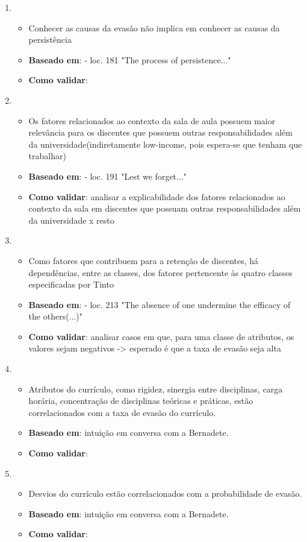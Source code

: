 \documentclass{article}
\begin{document}
\begin{enumerate}
\item 
	\begin{itemize}
	\item Conhecer as causas da evasão não implica em conhecer as causas da persistência
	\item \textbf{Baseado em}: \cite{tinto_completing} - loc. 181 "The process of persistence..."
	\item \textbf{Como validar}: 
	\end{itemize}
	
\item 
	\begin{itemize}
	\item Os fatores relacionados ao contexto da sala de aula possuem maior relevância para os discentes que possuem outras responsabilidades além da universidade(indiretamente low-income, pois espera-se que tenham que trabalhar)
	\item \textbf{Baseado em}: \cite{tinto_completing} - loc. 191 "Lest we forget..."
	\item \textbf{Como validar}: analisar a explicabilidade dos fatores relacionados ao contexto da sala em discentes que possuam outras responsabilidades além da universidade x resto
	\end{itemize}
	
\item 
	\begin{itemize}
	\item Como fatores que contribuem para a retenção de discentes, há dependências, entre as classes, dos fatores pertencente às quatro classes especificadas por Tinto
	\item \textbf{Baseado em}: \cite{tinto_completing} - loc. 213 "The absence of one undermine the efficacy of the others(...)"
	\item \textbf{Como validar}: analisar casos em que, para uma classe de atributos, os valores sejam negativos -> esperado é que a taxa de evasão seja alta
	\end{itemize}
	
\item 
	\begin{itemize}
	\item Atributos do currículo, como rigidez, sinergia entre disciplinas, carga horária, concentração de disciplinas teóricas e práticas, estão correlacionados com a taxa de evasão do currículo.
	\item \textbf{Baseado em}: intuição em conversa com a Bernadete.
	\item \textbf{Como validar}: 
	\end{itemize}	

\item 
	\begin{itemize}
	\item Desvios do currículo estão correlacionados com a probabilidade de evasão.
	\item \textbf{Baseado em}: intuição em conversa com a Bernadete.
	\item \textbf{Como validar}: 
	\end{itemize}	

\end{enumerate}
\end{document}
